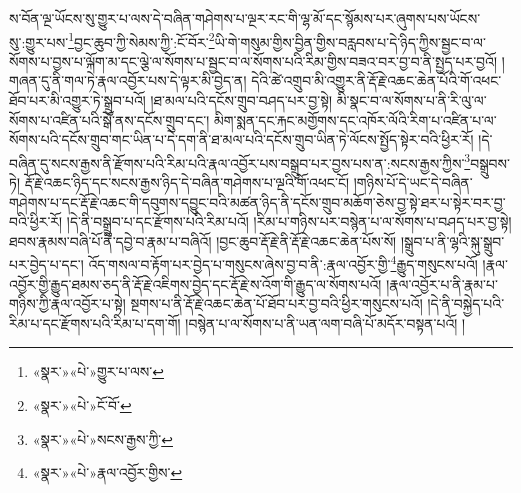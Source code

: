ས་བོན་ལྔ་ཡོངས་སུ་གྱུར་པ་ལས་དེ་བཞིན་གཤེགས་པ་ལྔར་རང་གི་ལྷ་མོ་དང་སྙོམས་པར་ཞུགས་པས་ཡོངས་སུ་:གྱུར་པས་\footnote{«སྣར་»«པེ་»གྱུར་པ་ལས་}བྱང་ཆུབ་ཀྱི་སེམས་ཀྱི་:ངོ་བོར་\footnote{«སྣར་»«པེ་»ངོ་བོ་}ཡི་གེ་གསུམ་གྱིས་བྱིན་གྱིས་བརླབས་པ་དེ་ཉིད་ཀྱིས་སྦྱང་བ་ལ་སོགས་པ་བྱས་པ་ལྐོག་མ་དང་ལྕེ་ལ་སོགས་པ་སྦྱང་བ་ལ་སོགས་པའི་རིམ་གྱིས་བཟའ་བར་བྱ་བ་ནི་སྤྱད་པར་བྱའོ། །གཞན་དུ་ནི་གལ་ཏེ་རྣལ་འབྱོར་པས་དེ་ལྟར་མི་བྱེད་ན། དེའི་ཚེ་འགྲུབ་མི་འགྱུར་ནི་རྡོ་རྗེ་འཆང་ཆེན་པོའི་གོ་འཕང་ཐོབ་པར་མི་འགྱུར་ཏེ་སྒྲུབ་པའོ། །ཐ་མལ་པའི་དངོས་གྲུབ་བཤད་པར་བྱ་སྟེ། མི་སྣང་བ་ལ་སོགས་པ་ནི་རི་ལུ་ལ་སོགས་པ་འཛིན་པའི་སྒོ་ནས་དངོས་གྲུབ་དང་། མིག་སྨན་དང་རྐང་མགྱོགས་དང་འཁོར་ལོའི་རིག་པ་འཛིན་པ་ལ་སོགས་པའི་དངོས་གྲུབ་གང་ཡིན་པ་དེ་དག་ནི་ཐ་མལ་པའི་དངོས་གྲུབ་ཡིན་ཏེ་ལོངས་སྤྱོད་སྟེར་བའི་ཕྱིར་རོ། །དེ་བཞིན་དུ་སངས་རྒྱས་ནི་རྫོགས་པའི་རིམ་པའི་རྣལ་འབྱོར་པས་བསྒྲུབ་པར་བྱས་པས་ན་:སངས་རྒྱས་ཀྱིས་\footnote{«སྣར་»«པེ་»སངས་རྒྱས་ཀྱི་}བསྒྲུབས་ཏེ། རྡོ་རྗེ་འཆང་ཉིད་དང་སངས་རྒྱས་ཉིད་དེ་བཞིན་གཤེགས་པ་ལྔའི་གོ་འཕང་ངོ། །གཉིས་པོ་དེ་ཡང་དེ་བཞིན་གཤེགས་པ་དང་རྡོ་རྗེ་འཆང་གི་དབུགས་དབྱུང་བའི་མཚན་ཉིད་ནི་དངོས་གྲུབ་མཆོག་ཅེས་བྱ་སྟེ་ཐར་པ་སྟེར་བར་བྱ་བའི་ཕྱིར་རོ། །དེ་ནི་བསྒྲུབ་པ་དང་རྫོགས་པའི་རིམ་པའོ། །རིམ་པ་གཉིས་པར་བསྙེན་པ་ལ་སོགས་པ་བཤད་པར་བྱ་སྟེ། ཐབས་རྣམས་བཞི་པོ་ནི་དབྱེ་བ་རྣམ་པ་བཞིའོ། །བྱང་ཆུབ་རྡོ་རྗེ་ནི་རྡོ་རྗེ་འཆང་ཆེན་པོས་སོ། །སྒྲུབ་པ་ནི་ལྷའི་སྐུ་སྒྲུབ་པར་བྱེད་པ་དང་། འོད་གསལ་བ་རྟོག་པར་བྱེད་པ་གསུངས་ཞེས་བྱ་བ་ནི་:རྣལ་འབྱོར་གྱི་\footnote{«སྣར་»«པེ་»རྣལ་འབྱོར་གྱིས་}རྒྱུད་གསུངས་པའོ། །རྣལ་འབྱོར་གྱི་རྒྱུད་ཐམས་ཅད་ནི་རྡོ་རྗེ་འཇིགས་བྱེད་དང་རྡོ་རྗེ་ས་འོག་གི་རྒྱུད་ལ་སོགས་པའོ། །རྣལ་འབྱོར་པ་ནི་རྣམ་པ་གཉིས་ཀྱི་རྣལ་འབྱོར་པ་སྟེ། སྔགས་པ་ནི་རྡོ་རྗེ་འཆང་ཆེན་པོ་ཐོབ་པར་བྱ་བའི་ཕྱིར་གསུངས་པའོ། །དེ་ནི་བསྐྱེད་པའི་རིམ་པ་དང་རྫོགས་པའི་རིམ་པ་དག་གོ། །བསྙེན་པ་ལ་སོགས་པ་ནི་ཡན་ལག་བཞི་པོ་མདོར་བསྟན་པའོ། །
